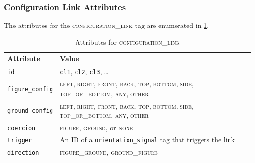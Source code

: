 \documentclass[11pt]{article}
\newenvironment{attributes}
{
\begin{tabular}{|l|l|}
    \hline \textbf{Attribute} & \textbf{Value}\\
}
{   \hline
\end{tabular}
}
\begin{document}
\label{ex:fig_ground_examples}




\subsubsection{Configuration Link Attributes} %
\label{ssub:configuration_link_attributes}

The attributes for the \textsc{configuration\_link} tag are enumerated in \cref{tab:configuration_link}. 

\begin{table}[h]
\centering
\begin{attributes}
    \hline \texttt{id}                  & \texttt{cl1}, \texttt{cl2}, 
                                          \texttt{cl3}, \ldots\\
    \hline \texttt{figure\_config}      & \textsc{left}, \textsc{right}, \textsc{front}, \textsc{back}, \textsc{top}, \textsc{bottom}, \textsc{side}, \textsc{top\_or\_bottom}, \textsc{any}, \textsc{other}\\
    \hline \texttt{ground\_config}      & \textsc{left}, \textsc{right}, \textsc{front}, \textsc{back}, \textsc{top}, \textsc{bottom}, \textsc{side}, \textsc{top\_or\_bottom}, \textsc{any}, \textsc{other}\\
    \hline \texttt{coercion}            & \textsc{figure}, \textsc{ground}, or \textsc{none}\\
    \hline \texttt{trigger}             & An ID of a \texttt{orientation\_signal} tag that triggers the link\\
    \hline \texttt{direction}           & \textsc{figure\_ground}, \textsc{ground\_figure}\\
\end{attributes}
\caption{Attributes for \textsc{configuration\_link}}
\label{tab:configuration_link}
\end{table}

\end{document}
